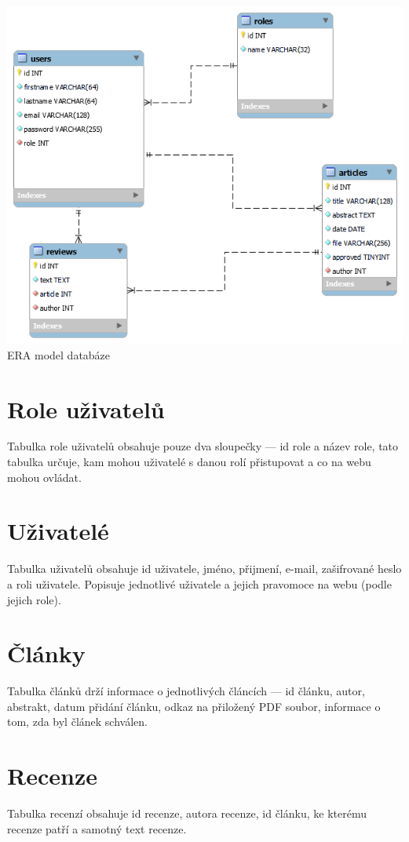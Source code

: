 \documentclass[
	12pt,
	a4paper,
	pdftex,
	czech,
	titlepage
]{report}
\begin{document}
\begin{center}

	\includegraphics[width=\textwidth,height=\textheight,keepaspectratio]{semestralka_model}
	ERA model databáze
\end{center}

\section{Role uživatelů}
Tabulka role uživatelů obsahuje pouze dva sloupečky --- id role a název role,
tato tabulka určuje, kam mohou uživatelé s danou rolí přistupovat a co na webu
mohou ovládat.

\section{Uživatelé}
Tabulka uživatelů obsahuje id uživatele, jméno, přijmení, e-mail, zašifrované
heslo a roli uživatele. Popisuje jednotlivé uživatele a jejich pravomoce na
webu (podle jejich role).

\section{Články}
Tabulka článků drží informace o jednotlivých článcích --- id článku, autor,
abstrakt,
datum přidání článku, odkaz na přiložený PDF soubor, informace o tom, zda byl
článek schválen.

\section{Recenze}
Tabulka recenzí obsahuje id recenze, autora recenze, id článku, ke kterému
recenze patří a samotný text recenze.
\end{document}
